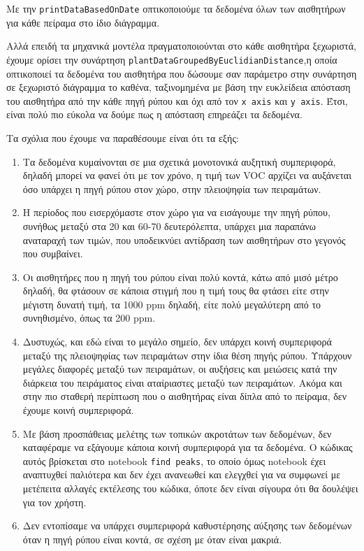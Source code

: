Με την \texttt{printDataBasedOnDate} οπτικοποιούμε τα δεδομένα όλων των αισθητήρων για κάθε πείραμα στο ίδιο διάγραμμα.

Αλλά επειδή τα μηχανικά μοντέλα πραγματοποιούνται στο κάθε αισθητήρα ξεχωριστά, έχουμε ορίσει 
την συνάρτηση \texttt{plantDataGroupedByEuclidianDistance},η οποία οπτικοποιεί τα δεδομένα του αισθητήρα που δώσουμε
σαν παράμετρο στην συνάρτηση σε ξεχωριστό διάγραμμα το καθένα,
ταξινομημένα με βάση την ευκλείδεια απόσταση του αισθητήρα από την κάθε πηγή 
ρύπου και όχι από τον \texttt{x axis} και \texttt{y axis}.
Έτσι, είναι πολύ πιο εύκολα να δούμε πως η απόσταση επηρεάζει τα δεδομένα.

Τα σχόλια που έχουμε να παραθέσουμε είναι ότι τα εξής:

\begin{enumerate}
    \item Τα δεδομένα κυμαίνονται σε μια σχετικά μονοτονικά αυξητική συμπεριφορά, δηλαδή μπορεί να φανεί ότι με τον χρόνο, η τιμή των VOC αρχίζει να αυξάνεται όσο υπάρχει η πηγή ρύπου στον χώρο, στην πλειοψηφία των πειραμάτων.
    \item Η περίοδος που εισερχόμαστε στον χώρο για να εισάγουμε την πηγή ρύπου, συνήθως μεταξύ στα 20 και 60-70 δευτερόλεπτα, υπάρχει μια παραπάνω αναταραχή των τιμών, που υποδεικνύει
    αντίδραση των αισθητήρων στο γεγονός που συμβαίνει.
    \item Οι αισθητήρες που η πηγή του ρύπου είναι πολύ κοντά, κάτω από μισό μέτρο δηλαδή, θα φτάσουν σε κάποια στιγμή που η τιμή τους θα φτάσει είτε στην μέγιστη δυνατή τιμή,
    τα 1000 ppm δηλαδή, είτε πολύ μεγαλύτερη από το συνηθισμένο, όπως τα 200 ppm.
    \item Δυστυχώς, και εδώ είναι το μεγάλο σημείο, δεν υπάρχει κοινή συμπεριφορά μεταξύ της πλειοψηφίας των πειραμάτων στην ίδια θέση πηγής ρύπου.
    Υπάρχουν μεγάλες διαφορές μεταξύ των πειραμάτων, οι αυξήσεις και μειώσεις κατά την διάρκεια του πειράματος είναι αταίριαστες μεταξύ των πειραμάτων.
    Ακόμα και στην πιο σταθερή περίπτωση που ο αισθητήρας είναι δίπλα από το πείραμα, δεν έχουμε κοινή συμπεριφορά.
    \item Με βάση προσπάθειας μελέτης των τοπικών ακροτάτων των δεδομένων, δεν καταφέραμε να εξάγουμε κάποια κοινή συμπεριφορά για τα δεδομένα.
    Ο κώδικας αυτός βρίσκεται στο notebook \texttt{find peaks},
    το οποίο όμως notebook έχει αναπτυχθεί παλιότερα και δεν έχει ανανεωθεί και ελεγχθεί για να συμφωνεί με μετέπειτα αλλαγές
    εκτέλεσης του κώδικα, όποτε δεν είναι σίγουρα ότι θα δουλέψει για τον χρήστη.
    \item Δεν εντοπίσαμε να υπάρχει συμπεριφορά καθυστέρησης αύξησης των δεδομένων όταν η πηγή ρύπου είναι κοντά, σε σχέση με όταν είναι μακριά.
\end{enumerate}

